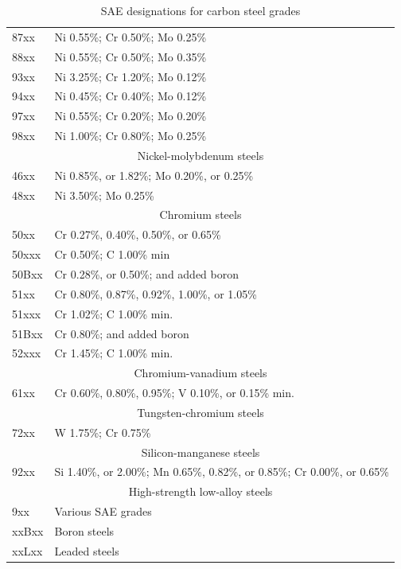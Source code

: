 \documentclass[
10pt,
a4paper,
openany,
svgnames,
]{book}
\begin{document}
\begin{table}[h]
\begin{tabular}{ll}
    87xx & Ni 0.55\%; Cr 0.50\%; Mo 0.25\% \\
    88xx & Ni 0.55\%; Cr 0.50\%; Mo 0.35\% \\
    93xx & Ni 3.25\%; Cr 1.20\%; Mo 0.12\% \\
    94xx & Ni 0.45\%; Cr 0.40\%; Mo 0.12\% \\
    97xx & Ni 0.55\%; Cr 0.20\%; Mo 0.20\% \\
    98xx & Ni 1.00\%; Cr 0.80\%; Mo 0.25\% \\
    \multicolumn{2}{c}{Nickel-molybdenum steels} \\
    46xx & Ni 0.85\%, or 1.82\%; Mo 0.20\%, or 0.25\% \\
    48xx & Ni 3.50\%; Mo 0.25\% \\
    \multicolumn{2}{c}{Chromium steels} \\
    50xx & Cr 0.27\%, 0.40\%, 0.50\%, or 0.65\% \\
    50xxx & Cr 0.50\%; C 1.00\% min \\
    50Bxx & Cr 0.28\%, or 0.50\%; and added boron \cite{bringas2004handbook} \\
    51xx & Cr 0.80\%, 0.87\%, 0.92\%, 1.00\%, or 1.05\% \\
    51xxx & Cr 1.02\%; C 1.00\% min. \\
    51Bxx & Cr 0.80\%; and added boron \cite{bringas2004handbook} \\
    52xxx & Cr 1.45\%; C 1.00\% min. \\
    \multicolumn{2}{c}{Chromium-vanadium steels} \\
    61xx & Cr 0.60\%, 0.80\%, 0.95\%; V 0.10\%, or 0.15\% min. \\
    \multicolumn{2}{c}{Tungsten-chromium steels} \\
    72xx & W 1.75\%; Cr 0.75\% \\
    \multicolumn{2}{c}{Silicon-manganese steels} \\
    92xx & Si 1.40\%, or 2.00\%; Mn 0.65\%, 0.82\%, or 0.85\%; Cr 0.00\%, or 0.65\% \\
    \multicolumn{2}{c}{High-strength low-alloy steels} \\
    9xx & Various SAE grades \\
    xxBxx & Boron steels \\
    xxLxx & Leaded steels \\
    \bottomrule
  \end{tabular}
  \caption{SAE designations for carbon steel grades \cite{oberg2016machinery}}
\end{table}

\nocite{*}

\backmatter

\printbibliography[heading=bibintoc]
\end{document}
